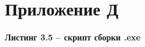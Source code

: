 \chapter*{Приложение Д}\label{ux43fux440ux438ux43bux43eux436ux435ux43dux438ux435-ux434}

\textbf{Листинг 3.5 -- скрипт сборки .exe}


